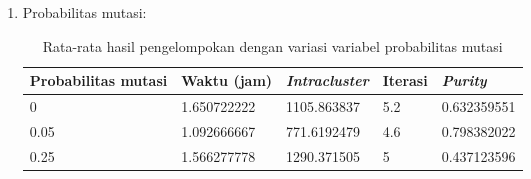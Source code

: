 \begin{enumerate}
		Berdasarkan Tabel \ref{tbl:exp-weight}, waktu yang diperlukan untuk pengelompokan menggunakan bobot TF-IDF jauh lebih cepat hingga 167\% dibandingan dengan menggunakan bobot frekuensi. \textit{Intracluster similarity} yang dihasilkan menggunakan bobot TF-IDF hanya 44\% dari \textit{intracluster similarity} yang dihasilkan apabila menggunakan bobot frekuensi. Hal ini terjadi karena bobot frekuensi dari suatu dokumen pasti lebih besar nilainya dibandingkan dengan bobot TF-IDF. Dengan menggunakan bobot frekuensi, banyaknya iterasi yang dilakukan 52\% lebih banyak dibandingkan dengan menggunakan bobot TF-IDF. Nilai purity yang didapatkan apabila menggunakan bobot TF-IDF 40\% lebih besar apabila dibandingkan dengan menggunakan bobot frekuensi. Berdasarkan Tabel \ref{tbl:exp-weight}, dibentuk empat buah grafik (Gambar \ref{fig:graph:weight-time} - \ref{fig:graph:weight-purity}) untuk menunjukan hubungan antara metode pembobotan dengan keempat variabel terikat.
		
		\begin{figure}[H]
			\centering
			\texttt{[image: grafik-bobot-waktu]}
			\caption{Grafik hubungan metode pembobotan dengan waktu pengelompokan}
			\label{fig:graph:weight-time}
		\end{figure}
		
		\begin{figure}[H]
			\centering
			\texttt{[image: grafik-bobot-intracluster]}
			\caption{Grafik hubungan metode pembobotan dengan \textit{intracluster similarity}}
			\label{fig:graph:weight-intra}
		\end{figure}
		
		\begin{figure}[H]
			\centering
			\texttt{[image: grafik-bobot-iterasi]}
			\caption{Grafik hubungan metode pembobotan dengan banyaknya iterasi}
			\label{fig:graph:weight-iteration}
		\end{figure}
		
		\begin{figure}[H]
			\centering
			\texttt{[image: grafik-bobot-purity]}
			\caption{Grafik hubungan metode pembobotan dengan nilai \textit{purity}}
			\label{fig:graph:weight-purity}
		\end{figure}
		
		\item Probabilitas mutasi:
		\begin{table}[H]
			\centering
			\begin{tabular}{|l|l|l|l|l|} \hline
				Probabilitas mutasi & Waktu (jam) & \textit{Intracluster} & Iterasi& \textit{Purity} \\ \hline
				0    & 1.650722222 & 1105.863837 & 5.2 & 0.632359551 \\
				0.05 & 1.092666667 & 771.6192479 & 4.6 & 0.798382022 \\
				0.25 & 1.566277778 & 1290.371505 & 5   & 0.437123596 \\ \hline
			\end{tabular}
			\caption{Rata-rata hasil pengelompokan dengan variasi variabel probabilitas mutasi}
			\label{tbl:exp-mutation}
		\end{table}
		

\end{enumerate}
